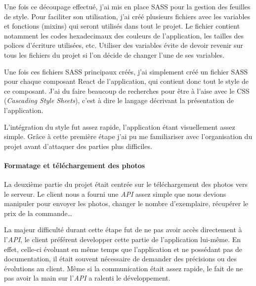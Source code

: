 \bigskip

Une fois ce découpage effectué, j'ai mis en place SASS pour la gestion
des feuilles de style. Pour faciliter son utilisation, j'ai créé
plusieurs fichiers avec les variables et fonctions (mixins) qui seront
utilisés dans tout le projet. Le fichier contient notamment les codes
hexadecimaux des couleurs de l'application, les tailles des polices
d'écriture utilisées, etc. Utiliser des variables évite de devoir
revenir sur tous les fichiers du projet si l'on décide de changer l'une
de ses variables.

\bigskip

Une fois ces fichiers SASS principaux créés, j'ai simplement créé un
fichier SASS pour chaque composant React de l'application, qui contient
donc tout le style de ce composant. J'ai du faire beaucoup de recherches
pour être à l'aise avec le CSS (\emph{Cascading Style Sheets}), c'est à
dire le langage décrivant la présentation de l'application.

\bigskip

L'intégration du style fut assez rapide, l'application étant
visuellement assez simple. Grâce à cette première étape j'ai pu me
familiariser avec l'organisation du projet avant d'attaquer des parties
plus difficiles.

\bigskip

\paragraph{Formatage et téléchargement des
photos}\label{formatage-et-tuxe9luxe9chargement-des-photos}

\bigskip

La deuxième partie du projet était centrée sur le téléchargement des
photos vers le serveur. Le client nous a fourni une \emph{API} assez
simple que nous devions manipuler pour envoyer les photos, changer le
nombre d'exemplaire, récupérer le prix de la commande\ldots{}

\bigskip

La majeur difficulté durant cette étape fut de ne pas avoir accès
directement à l'\emph{API}, le client préférent developper cette partie
de l'application lui-même. En effet, celle-ci évoluant en même temps que
l'application et ne possédant pas de documentation, il était souvent
nécessaire de demander des précisions ou des évolutions au client. Même
si la communication était assez rapide, le fait de ne pas avoir la main
sur l'\emph{API} a ralenti le développement.

